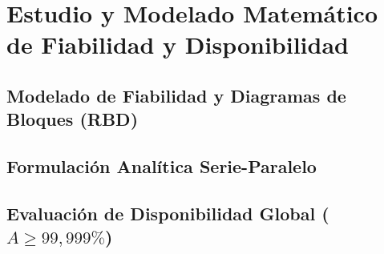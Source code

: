 \section{Estudio y Modelado Matemático de Fiabilidad y Disponibilidad}
\label{sec:fiabilidad_disponibilidad}

\subsection{Modelado de Fiabilidad y Diagramas de Bloques (RBD)}
\label{subsec:rbd_model}

\subsection{Formulación Analítica Serie-Paralelo}
\label{subsec:formulacion_matematica}

\subsection{Evaluación de Disponibilidad Global \texorpdfstring{($A \ge 99{,}999\%$)}{(A >= 99.999\%)}}
\label{subsec:evaluacion_disponibilidad}
